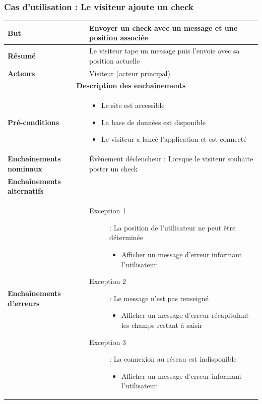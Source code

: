\documentclass[a4paper,12pt]{report}
\begin{document}
\begin{onehalfspace}
\begin{tabular}{|p{3cm}|p{}|}
\end{tabular}

\subsubsection{Cas d'utilisation : Le visiteur ajoute un check}
\begin{tabular}{|p{3cm}|p{}|}
\hline %

\textbf{But} &
Envoyer un check avec un message et une position associée
\\ \hline %

\textbf{Résumé} &
Le visiteur tape un message puis l'envoie avec sa position actuelle
\\ \hline %

\textbf{Acteurs} &
Visiteur (acteur principal)
\\ \hline %

\multicolumn{2}{|c|}{\textbf{Description des enchaînements}}
\\ \hline %

\textbf{Pré-conditions} &
    \begin{itemize}
      \item Le site est accessible
      \item La base de données est disponible
      \item Le visiteur a lancé l'application et est connecté
    \end{itemize}
\\ \hline %

\textbf{Enchaînements nominaux} &
  Évènement déclencheur : Lorsque le visiteur souhaite poster un check
\\ \hline %

\textbf{Enchaînements alternatifs} &
\\ \hline %

\textbf{Enchaînements d'erreurs} &
  \begin{description}
    \item[Exception 1]: La position de l'utilisateur ne peut être déterminée
    \begin{itemize}
      \item Afficher un message d’erreur informant l'utilisateur
    \end{itemize}
    \item[Exception 2]: Le message n'est pas renseigné
    \begin{itemize}
      \item Afficher un message d’erreur récapitulant les champs restant à saisir
    \end{itemize}
    \item[Exception 3]: La connexion au réseau est indisponible
    \begin{itemize}
      \item Afficher un message d’erreur informant l'utilisateur
    \end{itemize}
  \end{description}
\\ \hline %


\end{tabular}
\end{onehalfspace}
\end{document}
